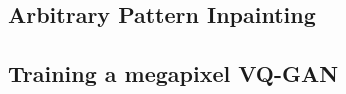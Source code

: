 \subsection{Arbitrary Pattern Inpainting}

\subsection{Training a megapixel VQ-GAN}

\label{sec:megagan}
